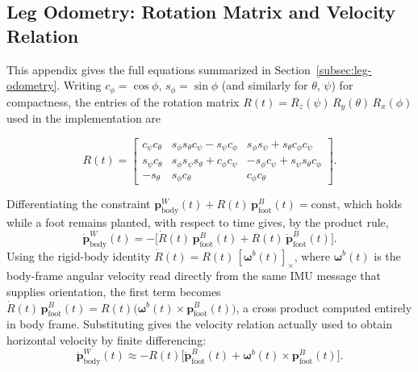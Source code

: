 \documentclass[12pt]{article}
\begin{document}
\subsection{Leg Odometry: Rotation Matrix and Velocity Relation}
\label{app:leg-odom-eqs}
This appendix gives the full equations summarized in Section~\ref{subsec:leg-odometry}. Writing $c_\phi = \cos\phi$, $s_\phi = \sin\phi$ (and similarly for $\theta$, $\psi$) for compactness, the entries of the rotation matrix $R(t) = R_z(\psi)\,R_y(\theta)\,R_x(\phi)$ used in the implementation are

\begin{equation}
R(t) =
\begin{bmatrix}
c_\psi c_\theta & s_\phi s_\theta c_\psi - s_\psi c_\phi & s_\phi s_\psi + s_\theta c_\phi c_\psi \\
s_\psi c_\theta & s_\phi s_\psi s_\theta + c_\phi c_\psi & -s_\phi c_\psi + s_\psi s_\theta c_\phi \\
-s_\theta & s_\phi c_\theta & c_\phi c_\theta
\end{bmatrix}.
\label{eq:rotation-matrix}
\end{equation}

Differentiating the constraint $\mathbf{p}^{W}_{\text{body}}(t) + R(t)\,\mathbf{p}^{B}_{\text{foot}}(t) = \text{const}$, which holds while a foot remains planted, with respect to time gives, by the product rule,
\begin{equation}
\dot{\mathbf{p}}^{W}_{\text{body}}(t) = -\Big[\dot R(t)\,\mathbf{p}^{B}_{\text{foot}}(t) + R(t)\,\dot{\mathbf{p}}^{B}_{\text{foot}}(t)\Big].
\end{equation}
Using the rigid-body identity $\dot R(t) = R(t)\,[\boldsymbol\omega^{b}(t)]_\times$, where $\boldsymbol\omega^{b}(t)$ is the body-frame angular velocity read directly from the same IMU message that supplies orientation, the first term becomes $\dot R(t)\,\mathbf{p}^{B}_{\text{foot}}(t) = R(t)\big(\boldsymbol\omega^{b}(t) \times \mathbf{p}^{B}_{\text{foot}}(t)\big)$, a cross product computed entirely in body frame. Substituting gives the velocity relation actually used to obtain horizontal velocity by finite differencing:
\begin{equation}
\dot{\mathbf{p}}^{W}_{\text{body}}(t) \approx -R(t)\Big[\dot{\mathbf{p}}^{B}_{\text{foot}}(t) + \boldsymbol\omega^{b}(t) \times \mathbf{p}^{B}_{\text{foot}}(t)\Big].
\end{equation}
\end{document}
